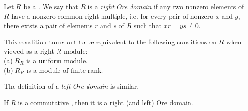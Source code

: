 \documentclass{article}
\begin{document}
Let $R$ be a .  
We say that $R$ is a {\it right Ore domain} 
if any two nonzero elements of $R$ 
have a nonzero common right multiple, 
i.e. for every pair of nonzero $x$ and $y$, 
there exists a pair of elements $r$ and $s$ of $R$ 
such that $xr = ys \neq 0$.\par
This condition turns out to be equivalent 
to the following conditions on $R$ when viewed as a right $R$-module:\\
(a) $R_R$ is a uniform module.\\
(b) $R_R$ is a module of finite rank.\par
The definition of a {\it left Ore domain} is similar.\par
If $R$ is a commutative , 
then it is a right (and left) Ore domain.
\end{document}
